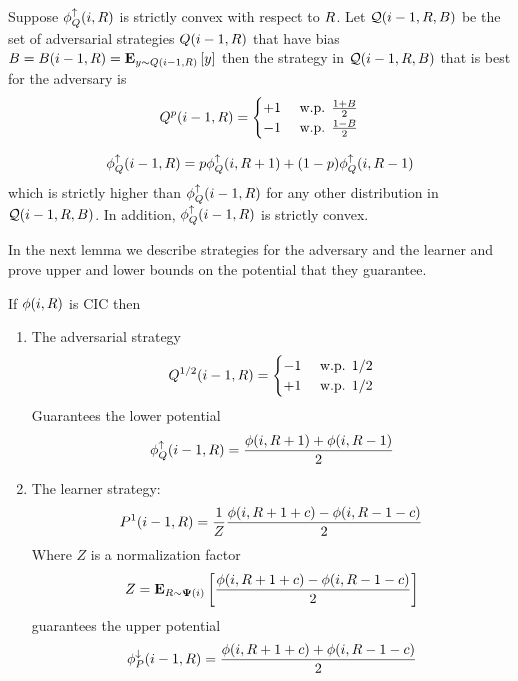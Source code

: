 \documentclass{article}[12pt]
\begin{document}
\begin{lemma} \label{lemma:adversary-prefers-extremes}
 Suppose $\phi_{Q}^{\uparrow}(i,R)$ is strictly convex with respect to  $R$.
Let ${\cal Q}(i-1,R,B)$ be the set of adversarial strategies 
$Q(i-1,R)$ that have bias
$B=B(i-1,R)= {\bf E}_{y \sim Q(i-1,R)}\left[ y \right]$ then the
strategy in ${\cal Q}(i-1,R,B)$ that is best for the adversary is
\begin{equation} \label{eqn:adv-strat-p}
  Q^p(i-1,R) =
  \begin{cases}
    +1 & \mbox{ w.p. } \frac{1+B}{2}\\
    -1 & \mbox{ w.p. } \frac{1-B}{2}\\
  \end{cases}
\end{equation}

\begin{equation} \label{eqn:value-iteration-lower-recursion}
  \phi_{Q}^{\uparrow}(i-1, R) = p \phi_{Q}^{\uparrow}(i,R+1) + (1-p)\phi_{Q}^{\uparrow}(i,R-1)
\end{equation}
which is strictly higher than $\phi_{Q}^{\uparrow}(i-1,R)$ for any other
distribution in ${\cal Q}(i-1,R,B)$. In addition,
$\phi_{Q}^{\uparrow}(i-1, R)$ is strictly convex.
\end{lemma}


In the next lemma we describe strategies for the adversary and the
learner and prove upper and lower bounds on the potential that they
guarantee.

\begin{lemma} \label{lemma:first-order-bound}
  If $\phi(i,R)$  is CIC then
  \begin{enumerate}
    \item The adversarial strategy
      \begin{equation} \label{eqn:adv-strat}
      Q^{1/2}(i-1,R) =
      \begin{cases}
        -1 & \mbox{ w.p. } 1/2\\
        +1 & \mbox{ w.p. } 1/2
      \end{cases}
    \end{equation}
    Guarantees the lower potential
 \begin{equation} \label{eqn:value-iteration-lower}
   \phi_{Q}^{\uparrow}(i-1, R) = \frac{\phi(i,R+1) + \phi(i,R-1)}{2}
 \end{equation}
   
    \item The learner strategy:
      \begin{equation} \label{eqn:learner-strat-1}
      P^1(i-1,R) = \frac{1}{Z} \frac{\phi(i,R+1+c) - \phi(i,R-1-c)}{2}
      \end{equation}
      Where $Z$ is a normalization factor
      $$Z = {\bf E}_{R \sim {\bf \Psi}(i)}\left[ \frac{\phi(i,R+1+c) - \phi(i,R-1-c)}{2} \right]$$
      guarantees the upper potential 
      \begin{equation} \label{eqn:value-iteration-upper-recursion}
        \phi_{P}^{\downarrow}(i-1, R) = \frac{\phi(i,R+1+c) + \phi(i,R-1-c)}{2}
      \end{equation}
    \end{enumerate}
    
\end{lemma}
\end{document}
